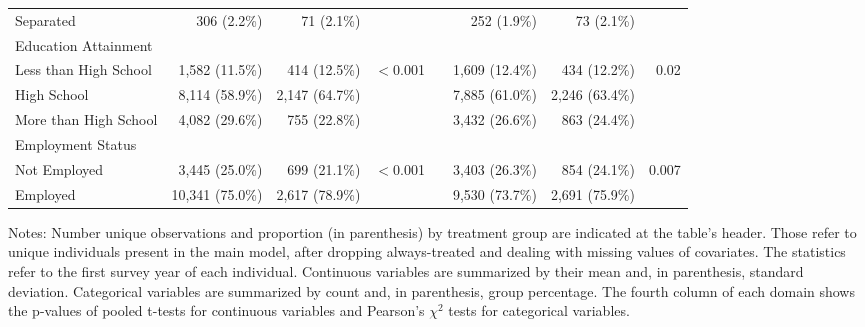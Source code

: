 {\begin{landscape}
\begin{table}
\begin{adjustbox}{max width=.8\linewidth}
\begin{threeparttable}
\begin{tabular}{l rrr c rrr}
                    \hspace{1em}Separated           & 306 (2.2\%)     & 71 (2.1\%)      &          &  & 252 (1.9\%)     & 73 (2.1\%)      &          \\
                    Education Attainment            &                 &                 &          &  &                 &                 &          \\
                    \hspace{1em}Less than High School       & 1,582 (11.5\%)  & 414 (12.5\%)    & $<$0.001 &  & 1,609 (12.4\%)  & 434 (12.2\%)    & 0.02     \\
                    \hspace{1em}High School         & 8,114 (58.9\%)  & 2,147 (64.7\%)  &          &  & 7,885 (61.0\%)  & 2,246 (63.4\%)  &          \\
                    \hspace{1em}More than High School       & 4,082 (29.6\%)  & 755 (22.8\%)    &          &  & 3,432 (26.6\%)  & 863 (24.4\%)    &          \\
                    Employment Status               &                 &                 &          &  &                 &                 &          \\
                    \hspace{1em}Not Employed        & 3,445 (25.0\%)  & 699 (21.1\%)    & $<$0.001 &  & 3,403 (26.3\%)  & 854 (24.1\%)    & 0.007    \\
                    \hspace{1em}Employed            & 10,341 (75.0\%) & 2,617 (78.9\%)  &          &  & 9,530 (73.7\%)  & 2,691 (75.9\%)  &          \\ \bottomrule
                \end{tabular}
                \begin{tablenotes}
                    \small
Notes: Number unique observations and proportion (in parenthesis) by treatment group are indicated at the table's header. Those refer to 
unique individuals present in the main model, after dropping always-treated and dealing
with missing values of covariates. The statistics refer to the first survey year of each individual. 
Continuous variables are summarized by their mean and, in parenthesis, standard deviation. 
Categorical variables are summarized by count and, in parenthesis, group percentage. The fourth column of each domain shows the p-values of
pooled t-tests for continuous variables and Pearson's $\chi^2$ tests for categorical variables. 
                \end{tablenotes}
            \end{threeparttable}
        \end{adjustbox}
    \end{table}
\end{landscape}
}


